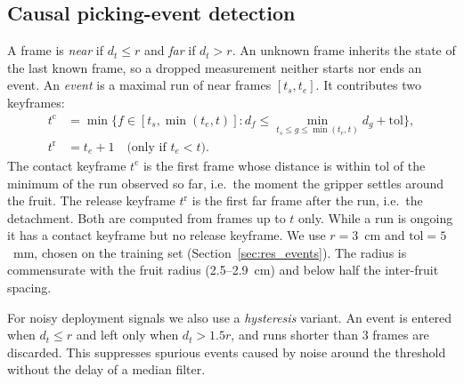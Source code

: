 \subsection{Causal picking-event detection}
\label{sec:events}
A frame is \emph{near} if $d_t \le r$ and \emph{far} if $d_t > r$. An unknown frame inherits the state of the last known frame, so a dropped measurement neither starts nor ends an event. An \emph{event} is a maximal run of near frames $[t_s, t_e]$. It contributes two keyframes:
\begin{align}
t^{\mathrm{c}} &= \min\Big\{ f \in [t_s, \min(t_e, t)] : d_f \le \min_{t_s \le g \le \min(t_e,t)} d_g + \mathrm{tol} \Big\}, \label{eq:contact}\\
t^{\mathrm{r}} &= t_e + 1 \quad \text{(only if } t_e < t\text{)}. \label{eq:release}
\end{align}
The contact keyframe $t^{\mathrm{c}}$ is the first frame whose distance is within $\mathrm{tol}$ of the minimum of the run observed so far, i.e.\ the moment the gripper settles around the fruit. The release keyframe $t^{\mathrm{r}}$ is the first far frame after the run, i.e.\ the detachment. Both are computed from frames up to $t$ only. While a run is ongoing it has a contact keyframe but no release keyframe. We use $r=3$~cm and $\mathrm{tol}=5$~mm, chosen on the training set (Section~\ref{sec:res_events}). The radius is commensurate with the fruit radius (2.5--2.9~cm) and below half the inter-fruit spacing.

For noisy deployment signals we also use a \emph{hysteresis} variant. An event is entered when $d_t \le r$ and left only when $d_t > 1.5r$, and runs shorter than 3 frames are discarded. This suppresses spurious events caused by noise around the threshold without the delay of a median filter.

